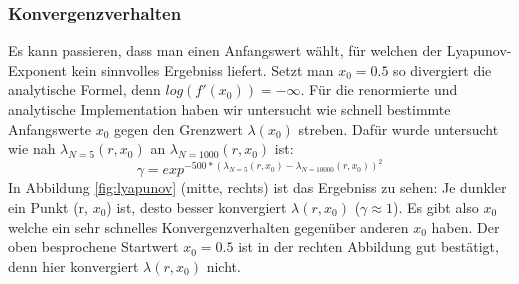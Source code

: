 \documentclass[12pt,a4paper]{article}
\begin{document}
\subsubsection{Konvergenzverhalten}
Es kann passieren, dass man einen Anfangswert wählt, für welchen der Lyapunov-Exponent kein sinnvolles Ergebniss liefert. Setzt man $x_0=0.5$ so divergiert die analytische Formel, denn $log(f'(x_0))=-\infty$.
Für die renormierte und analytische Implementation haben wir untersucht wie schnell bestimmte Anfangswerte $x_0$ gegen den Grenzwert $\lambda(x_0)$ streben. Dafür wurde untersucht wie nah $\lambda_{N=5}(r, x_0)$ an $\lambda_{N=1000}(r, x_0)$ ist:
\begin{equation}
    \gamma = exp^{-500 * (\lambda_{N=5}(r,x_0)
    - \lambda_{N=10000}(r,x_0))^2}
\end{equation}
In Abbildung \ref{fig:lyapunov} (mitte, rechts) ist das Ergebniss zu sehen: Je dunkler ein Punkt (r, $x_0$) ist, desto besser konvergiert $\lambda(r, x_0)$ ($\gamma \approx 1$). 
Es gibt also $x_0$ welche ein sehr schnelles Konvergenzverhalten gegenüber anderen $x_0$ haben. Der oben besprochene Startwert $x_0=0.5$ ist in der rechten Abbildung gut bestätigt, denn hier konvergiert $\lambda(r, x_0)$ nicht. 
\end{document}
